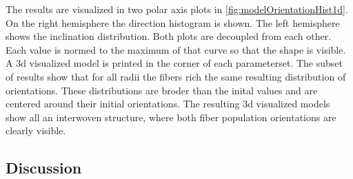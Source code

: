 % 
The results are visualized in two polar axis plots in \cref{fig:modelOrientationHist1d}. On the right hemisphere the direction histogram is shown.
The left hemisphere shows the inclination distribution.
Both plots are decoupled from each other. 
Each value is normed to the maximum of that curve so that the shape is visible.
A 3d visualized model is printed in the corner of each parameterset.
% 
The subset of results show that for all radii the fibers rich the same resulting distribution of orientations. 
These distributions are broder than the inital values and are centered around their initial orientations.
The resulting 3d visualized models show all an interwoven structure, where both fiber population orientations are clearly visible. 
%  
\subsection{Discussion}
%
% 
